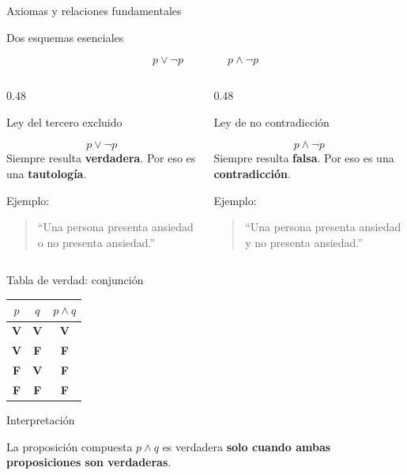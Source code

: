 \documentclass[aspectratio=169,10pt,handout]{beamer}
\newcommand{\destacado}[1]{\textcolor{PsyPrimary}{\textbf{#1}}}
\newcommand{\clave}[1]{\textcolor{PsyAccent}{\textbf{#1}}}
\newcommand{\verdadero}{\textcolor{PsyGood}{\textbf{V}}}
\newcommand{\falso}{\textcolor{PsyBad}{\textbf{F}}}
\newenvironment{IdeaClave}[1]
{
	\begin{block}{#1}
		\justifying
	}
	{
	\end{block}
}
\newenvironment{Alerta}[1]
{
	\begin{alertblock}{#1}
		\justifying
	}
	{
	\end{alertblock}
}
\newenvironment{Ejemplo}[1]
{
	\begin{exampleblock}{#1}
		\justifying
	}
	{
	\end{exampleblock}
}
\begin{document}
	\begin{frame}{Axiomas y relaciones fundamentales}
		\begin{IdeaClave}{Dos esquemas esenciales}
			\[
			p \lor \neg p
			\qquad\qquad
			p \land \neg p
			\]
		\end{IdeaClave}
		
		\pause
		
		\begin{columns}[T,totalwidth=\textwidth]
			\begin{column}{0.48\textwidth}
				\begin{Ejemplo}{Ley del tercero excluido}
					\[
					p \lor \neg p
					\]
					Siempre resulta \destacado{verdadera}. Por eso es una \clave{tautología}.
					
					Ejemplo:
					\begin{quote}
						``Una persona presenta ansiedad o no presenta ansiedad.''
					\end{quote}
				\end{Ejemplo}
			\end{column}
			\begin{column}{0.48\textwidth}
				\begin{Alerta}{Ley de no contradicción}
					\[
					p \land \neg p
					\]
					Siempre resulta \destacado{falsa}. Por eso es una \clave{contradicción}.
					
					Ejemplo:
					\begin{quote}
						``Una persona presenta ansiedad y no presenta ansiedad.''
					\end{quote}
				\end{Alerta}
			\end{column}
		\end{columns}
	\end{frame}
	
	\begin{frame}{Tabla de verdad: conjunción}
		\begin{center}
			\renewcommand{\arraystretch}{1.5}
			\begin{tabular}{c c c}
				\toprule
				$p$ & $q$ & $p \land q$ \\
				\midrule
				\verdadero & \verdadero & \verdadero \\
				\verdadero & \falso     & \falso \\
				\falso     & \verdadero & \falso \\
				\falso     & \falso     & \falso \\
				\bottomrule
			\end{tabular}
		\end{center}
		
		\pause
		
		\begin{IdeaClave}{Interpretación}
			La proposición compuesta $p \land q$ es verdadera \destacado{solo cuando ambas proposiciones son verdaderas}.
		\end{IdeaClave}
	\end{frame}
	
\end{document}
